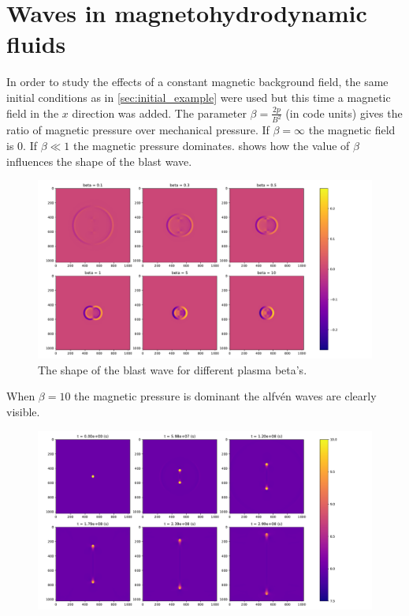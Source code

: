 \documentclass{article}
\begin{document}
\section{Waves in magnetohydrodynamic fluids} \label{sec:waves_in_magnetorhydrodynamic_fluids}
In order to study the effects of a constant magnetic background field, the same initial conditions as in \cref{sec:initial_example} were used but this time a magnetic field in the $x$ direction was added.
The parameter $\beta = \frac{2p}{B^2}$ (in code units) gives the ratio of magnetic pressure over mechanical pressure. 
If $\beta = \infty$ the magnetic field is $0$. 
If $\beta \ll 1$ the magnetic pressure dominates. 
 shows how the value of $\beta$ influences the shape of the blast wave.
\begin{figure}[H]
	\centering
	\includegraphics[width = \linewidth]{figures/influence_beta.pdf}
	\caption{The shape of the blast wave for different plasma beta's.}
\label{fig:blastwave_shape_beta}
\end{figure}

When $\beta  = 10$ the magnetic pressure is dominant the alfv\'en  waves are clearly visible.

\begin{figure}[H]
	\centering
	\includegraphics[width=\textwidth]{figures/alven_wave.pdf}
	\caption{}
	\label{fig:Alfven_wave}
\end{figure}
\end{document}
